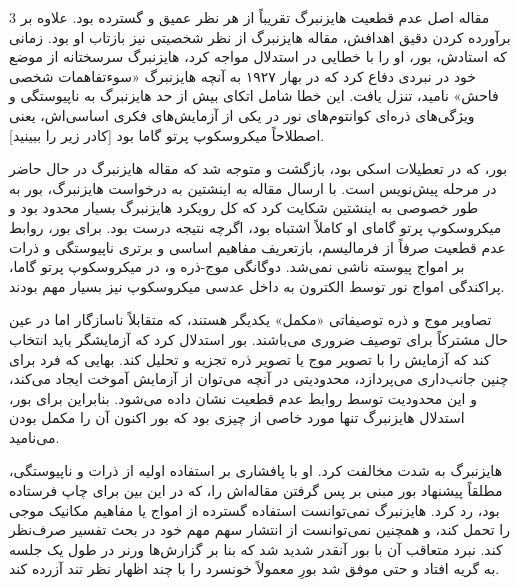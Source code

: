 \documentclass[11pt,a4paper]{article}
\begin{document}
\begin{multicols}{3}
مقاله اصل عدم قطعیت هایزنبرگ تقریباً از هر نظر عمیق و گسترده بود. علاوه بر برآورده کردن دقیق اهدافش، مقاله هایزنبرگ از نظر شخصیتی نیز بازتاب او بود. زمانی که استادش، بور، او را با خطایی در استدلال مواجه کرد، هایزنبرگ سرسختانه از موضع خود در نبردی دفاع کرد که در بهار ۱۹۲۷ به آنچه هایزنبرگ «سوءتفاهمات شخصی فاحش» نامید، تنزل یافت. این خطا شامل اتکای بیش از حد هایزنبرگ به ناپیوستگی و ویژگی‌های ذره‌ای کوانتوم‌های نور در یکی از آزمایش‌های فکری اساسی‌اش، یعنی اصطلاحاً میکروسکوپ پرتو گاما بود [کادر زیر را ببینید].

\vspace{0.5em}
\noindent بور، که در تعطیلات اسکی بود، بازگشت و متوجه شد که مقاله هایزنبرگ در حال حاضر در مرحله پیش‌نویس است. با ارسال مقاله به اینشتین به درخواست هایزنبرگ، بور به طور خصوصی به اینشتین شکایت کرد که کل رویکرد هایزنبرگ بسیار محدود بود و میکروسکوپ پرتو گامای او کاملاً اشتباه بود، اگرچه نتیجه درست بود. برای بور، روابط عدم قطعیت صرفاً از فرمالیسم، بازتعریف مفاهیم اساسی و برتری ناپیوستگی و ذرات بر امواج پیوسته ناشی نمی‌شد. دوگانگی موج-ذره و، در میکروسکوپ پرتو گاما، پراکندگی امواج نور توسط الکترون به داخل عدسی میکروسکوپ نیز بسیار مهم بودند.

تصاویر موج و ذره توصیفاتی «مکمل» یکدیگر هستند، که متقابلاً ناسازگار اما در عین حال مشترکاً برای توصیف ضروری می‌باشند. بور استدلال کرد که آزمایشگر باید انتخاب کند که آزمایش را با تصویر موج یا تصویر ذره تجزیه و تحلیل کند. بهایی که فرد برای چنین جانب‌داری می‌پردازد، محدودیتی در آنچه می‌توان از آزمایش آموخت ایجاد می‌کند، و این محدودیت توسط روابط عدم قطعیت نشان داده می‌شود. بنابراین برای بور، استدلال هایزنبرگ تنها مورد خاصی از چیزی بود که بور اکنون آن را مکمل بودن می‌نامید.

هایزنبرگ به شدت مخالفت کرد. او با پافشاری بر استفاده اولیه از ذرات و ناپیوستگی، مطلقاً پیشنهاد بور مبنی بر پس گرفتن مقاله‌اش را، که در این بین برای چاپ فرستاده بود، رد کرد. هایزنبرگ نمی‌توانست استفاده گسترده از امواج یا مفاهیم مکانیک موجی را تحمل کند، و همچنین نمی‌توانست از انتشار سهم مهم خود در بحث تفسیر صرف‌نظر کند. نبرد متعاقب آن با بور آنقدر شدید شد که بنا بر گزارش‌ها ورنر در طول یک جلسه به گریه افتاد و حتی موفق شد بورِ معمولاً خونسرد را با چند اظهار نظر تند آزرده کند.

\end{multicols}
 
\end{document}
